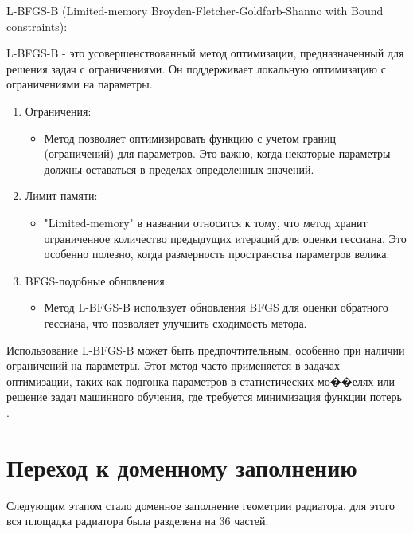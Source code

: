 \documentclass[a4paper,12pt]{extreport}
\numberwithin{equation}{chapter}
\begin{document}
L-BFGS-B (Limited-memory Broyden-Fletcher-Goldfarb-Shanno with Bound constraints):

L-BFGS-B - это усовершенствованный метод оптимизации, предназначенный для решения задач с ограничениями. Он поддерживает локальную оптимизацию с ограничениями на параметры.

\begin{enumerate}
	\item Ограничения:
	      \begin{itemize}
		      \item Метод позволяет оптимизировать функцию с учетом границ (ограничений) для параметров. Это важно, когда некоторые параметры должны оставаться в пределах определенных значений.
	      \end{itemize}
	\item Лимит памяти:
	      \begin{itemize}
		      \item "Limited-memory" в названии относится к тому, что метод хранит ограниченное количество предыдущих итераций для оценки гессиана. Это особенно полезно, когда размерность пространства параметров велика.
	      \end{itemize}
	\item BFGS-подобные обновления:
	      \begin{itemize}
		      \item Метод L-BFGS-B использует обновления BFGS для оценки обратного гессиана, что позволяет улучшить сходимость метода.
	      \end{itemize}
\end{enumerate}

Использование L-BFGS-B может быть предпочтительным, особенно при наличии ограничений на параметры. Этот метод часто применяется в задачах оптимизации, таких как подгонка параметров в статистических мо��елях или решение задач машинного обучения, где требуется минимизация функции потерь \cite{limited_BFGS}.

\newpage
\section*{Переход к доменному заполнению}
Следующим этапом стало доменное заполнение геометрии радиатора, для этого вся площадка радиатора была разделена на 36 частей.
\end{document}
